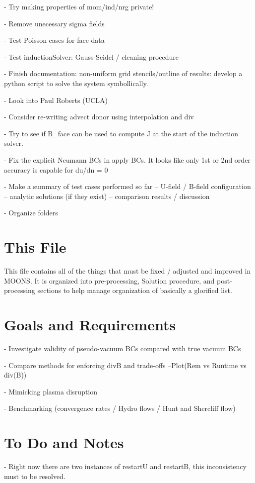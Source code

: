 \documentclass[11pt]{article}
\begin{document}
- Try making properties of mom/ind/nrg private!

- Remove unecessary sigma fields

- Test Poisson cases for face data

- Test inductionSolver: Gauss-Seidel / cleaning procedure

- Finish documentation: non-uniform grid stencils/outline of results: develop a python script to solve the system symbollically.

- Look into Paul Roberts (UCLA)

- Consider re-writing advect donor using interpolation and div

- Try to see if B\_face can be used to compute J at the start of the induction solver.

- Fix the explicit Neumann BCs in apply BCs. It looks like only 1st or 2nd order accuracy is capable for du/dn = 0

- Make a summary of test cases performed so far
-- U-field / B-field configuration 
-- analytic solutions (if they exist)
-- comparison results / discussion

- Organize folders

\section{This File}
This file contains all of the things that must be fixed / adjusted and improved in MOONS. It is organized into pre-processing, Solution procedure, and post-processing sections to help manage organization of basically a glorified list.

\section{Goals and Requirements}

- Investigate validity of pseudo-vacuum BCs compared with true vacuum BCs

- Compare methods for enforcing divB and trade-offs
--Plot(Rem vs Runtime vs div(B))

- Mimicking plasma disruption

- Benchmarking (convergence rates / Hydro flows / Hunt and Shercliff flow)

\section{To Do and Notes}
- Right now there are two instances of restartU and restartB, this inconsistency must to be resolved.
\end{document}
